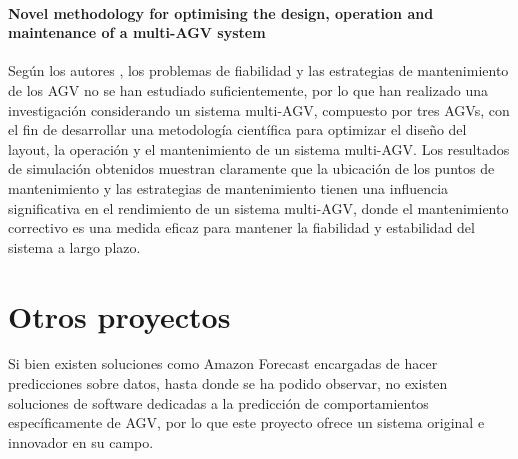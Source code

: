 \paragraph{Novel methodology for optimising the design, operation and maintenance of a multi-AGV system}
Según los autores \cite{YAN2018130}, los problemas de fiabilidad y las estrategias de mantenimiento de los AGV no se han estudiado suficientemente,
por lo que han realizado una investigación considerando un sistema multi-AGV, compuesto por tres AGVs, con 
el fin de desarrollar una metodología científica para optimizar el diseño del layout, la operación y el 
mantenimiento de un sistema multi-AGV. Los resultados de simulación obtenidos muestran claramente que la 
ubicación de los puntos de mantenimiento y las estrategias de mantenimiento tienen una influencia 
significativa en el rendimiento de un sistema multi-AGV, donde el mantenimiento correctivo es una medida 
eficaz para mantener la fiabilidad y estabilidad del sistema a largo plazo.

\section{Otros proyectos}

Si bien existen soluciones como Amazon Forecast encargadas de hacer predicciones sobre datos, hasta donde se ha podido observar, 
no existen soluciones de software dedicadas a la predicción de comportamientos específicamente de AGV, por lo que este proyecto 
ofrece un sistema original e innovador en su campo.